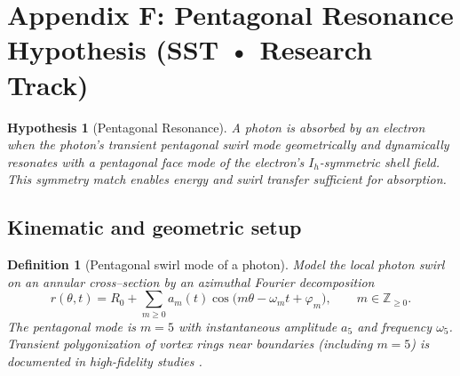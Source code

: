 \section*{Appendix F: Pentagonal Resonance Hypothesis (SST • Research Track)}
\label{sec:pentagonal-resonance}

\providecommand{\swirlarrow}{\!\!\scriptsize\boldsymbol{\circlearrowleft}}
\providecommand{\vswirl}{\mathbf{v}_{\swirlarrow}}
\providecommand{\xig}{\operatorname{asinh}\!\left(\tfrac{1}{2}\right)}  %
\providecommand{\phig}{\exp(\xig)}                                      %
\providecommand{\xigold}{\tfrac{3}{2}\,\xig}                            %
\providecommand{\Ce}{C_e}                                               %
\providecommand{\rc}{r_c}                                               %

\newtheorem{hypothesis}{Hypothesis}
\newtheorem{law}{Law}
\newtheorem{definition}{Definition}
\newtheorem{corollary}{Corollary}

\begin{hypothesis}[Pentagonal Resonance]
    A photon is absorbed by an electron when the photon's \emph{transient pentagonal swirl mode}
    geometrically and dynamically resonates with a \emph{pentagonal face mode}
    of the electron's \(I_h\)-symmetric shell field. This symmetry match enables energy and swirl transfer sufficient for absorption.
\end{hypothesis}

\subsection*{Kinematic and geometric setup}
\begin{definition}[Pentagonal swirl mode of a photon]
    Model the local photon swirl on an annular cross–section by an azimuthal Fourier decomposition
    \[
        r(\theta,t)=R_0+\sum_{m\ge 0} a_m(t)\cos\!\big(m\theta-\omega_m t+\varphi_m\big),
        \qquad m\in\mathbb{Z}_{\ge 0}.
    \]
    The \emph{pentagonal} mode is \(m=5\) with instantaneous amplitude \(a_5\) and frequency \(\omega_5\).
    Transient polygonization of vortex rings near boundaries (including \(m=5\)) is documented in high-fidelity studies \cite{orlandi1993vortex}.
\end{definition}

